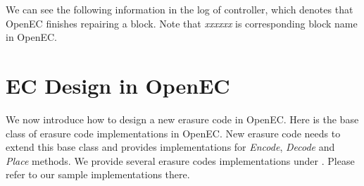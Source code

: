 \documentclass[letterpaper,12pt]{article}
\newcommand{\openec}{{\sf\small OpenEC}\xspace}
\begin{document}
We can see the following information in the log of controller, which denotes that \openec finishes repairing a block.
Note that {\sl xxxxxx} is corresponding block name in \openec.

\begin{center}
\noindent{}
\end{center}

\section{EC Design in OpenEC}

We now introduce how to design a new erasure code in \openec. Here is the base class of erasure code 
implementations in \openec. New erasure code needs to extend this base class and provides implementations
for {\sl Encode}, {\sl Decode} and {\sl Place} methods. We provide several erasure codes implementations
under . Please refer to our sample implementations there.


\begin{center}
\noindent{}

\end{center}
\end{document}
